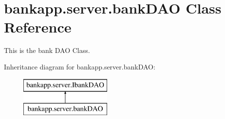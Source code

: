 \hypertarget{classbankapp_1_1server_1_1bankDAO}{}\section{bankapp.\+server.\+bank\+D\+AO Class Reference}
\label{classbankapp_1_1server_1_1bankDAO}


This is the bank D\+AO Class.  


Inheritance diagram for bankapp.\+server.\+bank\+D\+AO\+:\begin{figure}[H]
\begin{center}
\leavevmode
\includegraphics[height=2.000000cm]{classbankapp_1_1server_1_1bankDAO}
\end{center}
\end{figure}
